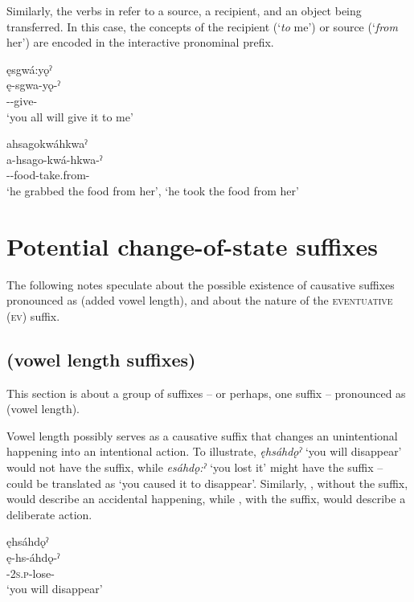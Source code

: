 Similarly, the verbs in  refer to a source, a recipient, and an object being transferred. In this case, the concepts of the recipient (‘\emph{to} me’) or source (‘\emph{from} her’) are encoded in the interactive pronominal prefix.

\ea\label{ex:preposex2} 
\ea  ęsgwá:yǫˀ\\
\gll ę-sgwa-yǫ-ˀ\\
 \fut--give-{\punctual}\\
\glt `you all will give it to me'

\ex ahsagokwáhkwaˀ \\
\gll a-hsago-kwá-hkwa-ˀ\\
 {\factual}--food-take.from-{\punctual}\\
\glt ‘he grabbed the food from her’, `he took the food from her'
\z
\z



\section{Potential change-of-state suffixes} \label{Potential change-of-state suffixes}
The following notes speculate about the possible existence of causative suffixes pronounced as \phonet{-:} (added vowel length), and about the nature of the  \textsc{eventuative} (\textsc{ev}) suffix.


\subsection{\stem{-:} (vowel length suffixes)} \label{[-:] (vowel length suffixes)}
This section is about a group of suffixes -- or perhaps, one suffix -- pronounced as \phonet{-:} (vowel length).

Vowel length possibly serves as a causative suffix \stem{-:} that changes an unintentional happening into an intentional action. To illustrate, \textit{ęhsáhdǫˀ} ‘you will disappear’  would not have the suffix, while \textit{esáhdǫ:ˀ} ‘you lost it’  might have the suffix --  could be translated as ‘you caused it to disappear’. Similarly, , without the \stem{-:} suffix, would describe an accidental happening, while , with the suffix, would describe a deliberate action.

\ea\label{ex:vlengsuf} 
\ea ęhsáhdǫˀ\\\label{ex:vlengsufa}
\gll ę-hs-áhdǫ-ˀ\\
 \fut-\textsc{2s.p}-lose-{\punctual}\\
\glt `you will disappear'

